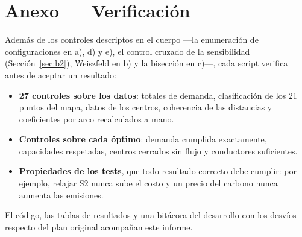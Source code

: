 \documentclass[10pt,a4paper]{article}
\begin{document}
\section*{Anexo — Verificación}

Además de los controles descriptos en el cuerpo —la enumeración de
configuraciones en a), d) y e), el control cruzado de la sensibilidad
(Sección~\ref{sec:b2}), Weiszfeld en b) y la bisección en c)—, cada script
verifica antes de aceptar un resultado:

\begin{itemize}
  \item \textbf{27 controles sobre los datos}: totales de demanda, clasificación
  de los 21 puntos del mapa, datos de los centros, coherencia de las distancias
  y coeficientes por arco recalculados a mano.
  \item \textbf{Controles sobre cada óptimo}: demanda cumplida exactamente,
  capacidades respetadas, centros cerrados sin flujo y conductores suficientes.
  \item \textbf{Propiedades de los tests}, que todo resultado correcto debe
  cumplir: por ejemplo, relajar S2 nunca sube el costo y un precio del carbono
  nunca aumenta las emisiones.
\end{itemize}

El código, las tablas de resultados y una bitácora del desarrollo con los
desvíos respecto del plan original acompañan este informe.

\renewcommand{\refname}{Bibliografía}
\end{document}
